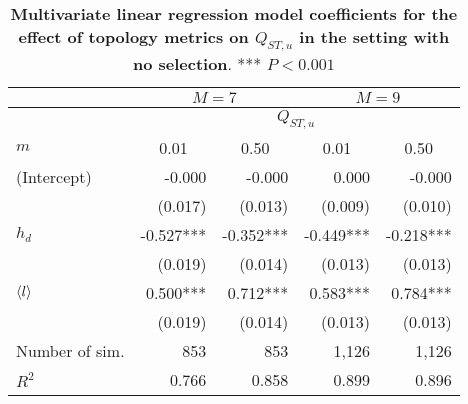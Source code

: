 \begin{table}[ht]
  \centering
  \begin{tabular}{|l|r|r|r|r|}
    \hline
    &                                                    \multicolumn{2}{c|}{$M=7$} & \multicolumn{2}{c|}{$M=9$}                                         \\
\hline
    &                                                    \multicolumn{4}{c|}{$Q_{ST,u}$}                                                               \\
\hline
$m$             & \multicolumn{1}{c|}{0.01} & \multicolumn{1}{c|}{0.50}  & \multicolumn{1}{c|}{0.01} & \multicolumn{1}{c|}{0.50} \\
    \hline 
    (Intercept) &                   -0.000 &                   -0.000 &                    0.000 &                   -0.000 \\       
                &                  (0.017) &                  (0.013) &                  (0.009) &                  (0.010) \\       
    $h_d$       &                -0.527*** &                -0.352*** &                -0.449*** &                -0.218*** \\       
                &                  (0.019) &                  (0.014) &                  (0.013) &                  (0.013) \\       
    $\langle l \rangle$        &                 0.500*** &                 0.712*** &                 0.583*** &                 0.784*** \\       
                &                  (0.019) &                  (0.014) &                  (0.013) &                  (0.013) \\       
    \hline 
Number of sim.  &                      853 &                      853 &                    1,126 &                    1,126 \\       
    $R^2$       &                    0.766 &                    0.858 &                    0.899 &                    0.896 \\       
    \hline 
    \end{tabular}
    \caption{ \textbf{Multivariate linear regression model coefficients for the effect of topology metrics on $Q_{ST,u}$ in the setting with no selection}. *** $P < 0.001$}
    \label{tableSI:coefficients_set1}
\end{table}


